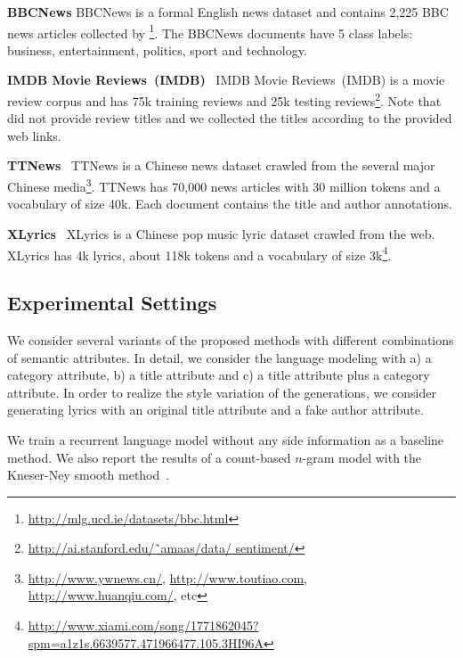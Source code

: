 \documentclass[a4paper]{article}
\begin{document}
\iffalse
\textbf{WikiText2}~
WikiText2 is made of selected Wikipedia articles and has 2 million training tokens and a vocabulary size of 33k~\cite{merity2017pointer}. We also use the topic model to extract a category attribute for each document with the topic number as $5$. We also put the semantic analysis of this category attribute in Appendix A.
\fi

\textbf{BBCNews}
BBCNews is a formal English news dataset and contains 2,225 BBC news articles collected by \citeauthor{griffiths2004integrating}\footnote{\url{http://mlg.ucd.ie/datasets/bbc.html}}. The BBCNews documents have 5 class labels: business, entertainment, politics, sport and technology.

\textbf{IMDB Movie Reviews~(IMDB)}~
IMDB Movie Reviews~(IMDB) is a movie review corpus \cite{maas2011learning} and has 75k training reviews and 25k testing reviews\footnote{\url{http://ai.stanford.edu/˜amaas/data/
sentiment/}}. Note that \citeauthor{maas2011learning} did not provide review titles and we collected the titles according to the provided web links.

\textbf{TTNews}~
TTNews is a Chinese news dataset crawled from the several major Chinese media\footnote{\url{http://www.ywnews.cn/}, \url{http://www.toutiao.com}, \url{http://www.huanqiu.com/}, etc}. TTNews has 70,000 news articles with 30 million tokens and a vocabulary of size 40k. Each document contains the title and author annotations.

\textbf{XLyrics}~
XLyrics is a Chinese pop music lyric dataset crawled from the web. XLyrics has 4k lyrics, about 118k tokens and a vocabulary of size 3k\footnote{\url{http://www.xiami.com/song/1771862045?spm=a1z1s.6639577.471966477.105.3HI96A}}.

\subsection{Experimental Settings}
We consider several variants of the proposed methods with different combinations of semantic attributes. In detail, we consider the language modeling with a) a category attribute, b) a title attribute and c) a title attribute plus a category attribute. In order to realize the style variation of the generations, we consider generating lyrics with an original title attribute and a fake author attribute.

We train a recurrent language model without any side information as a baseline method. We also report the results of a count-based $n$-gram model with the Kneser-Ney smooth method~\cite{chen1996empirical,heafield2011kenlm}.
\end{document}
